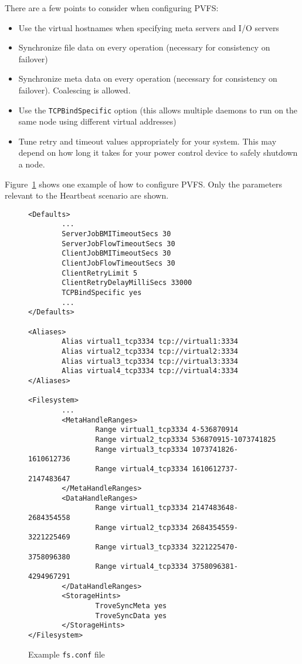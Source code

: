 \documentclass[11pt]{article}
\begin{document}
There are a few points to consider when configuring PVFS:
\begin{itemize}
\item Use the virtual hostnames when specifying meta servers and I/O
servers
\item Synchronize file data on every operation (necessary for consistency on
failover)
\item Synchronize meta data on every operation (necessary for consistency on
failover).  Coalescing is allowed.
\item Use the \texttt{TCPBindSpecific} option (this allows multiple daemons to
run on the same node using different virtual addresses)
\item Tune retry and timeout values appropriately for your system.  This
may depend on how long it takes for your power control device to safely
shutdown a node.
\end{itemize}

Figure~\ref{fig:pvfs2conf} shows one example of how to configure PVFS.
Only the parameters relevant to the Heartbeat scenario are shown.

\begin{figure}
\begin{scriptsize}
\begin{verbatim}
<Defaults>
        ...
        ServerJobBMITimeoutSecs 30
        ServerJobFlowTimeoutSecs 30
        ClientJobBMITimeoutSecs 30
        ClientJobFlowTimeoutSecs 30
        ClientRetryLimit 5
        ClientRetryDelayMilliSecs 33000
        TCPBindSpecific yes
        ...
</Defaults>

<Aliases>
        Alias virtual1_tcp3334 tcp://virtual1:3334
        Alias virtual2_tcp3334 tcp://virtual2:3334
        Alias virtual3_tcp3334 tcp://virtual3:3334
        Alias virtual4_tcp3334 tcp://virtual4:3334
</Aliases>

<Filesystem>
        ...
        <MetaHandleRanges>
                Range virtual1_tcp3334 4-536870914
                Range virtual2_tcp3334 536870915-1073741825
                Range virtual3_tcp3334 1073741826-1610612736
                Range virtual4_tcp3334 1610612737-2147483647
        </MetaHandleRanges>
        <DataHandleRanges>
                Range virtual1_tcp3334 2147483648-2684354558
                Range virtual2_tcp3334 2684354559-3221225469
                Range virtual3_tcp3334 3221225470-3758096380
                Range virtual4_tcp3334 3758096381-4294967291
        </DataHandleRanges>
        <StorageHints>
                TroveSyncMeta yes
                TroveSyncData yes
        </StorageHints>
</Filesystem>
\end{verbatim}
\end{scriptsize}
\caption{Example \texttt{fs.conf} file}
\label{fig:pvfs2conf}
\end{figure}
\end{document}
